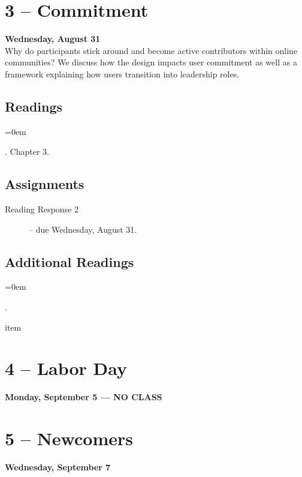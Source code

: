 \documentclass[11pt]{memoir}
\newenvironment{readinglist}{
\begin{list}{}{\leftmargin=8pt \itemindent=0em}
  \setlength{\itemsep}{8pt}
  \setlength{\parskip}{0em}
  \setlength{\parsep}{1em}
  \setlength{\parindent}{8em}}
{\end{list}}
\begin{document}
\section{3 -- Commitment}
\textcolor{CUGold}{\textbf{Wednesday, August 31}}\\
Why do participants stick around and become active contributors within online communities? We discuss how the design impacts user commitment as well as a framework explaining how users transition into leadership roles.

    \subsection{Readings}
    \begin{readinglist}
        \item {}
        \item {}. Chapter 3.
        \item {}
    \end{readinglist}
    
    \subsection{Assignments}
    \begin{description}%
        \item[Reading Response 2 ] -- due Wednesday, August 31. 
    \end{description}
    
    \subsection{Additional Readings}
    \begin{readinglist}
        \item {}.
        \item \bibentry{}
        item \bibentry{}
    \end{readinglist}

\section{4 -- Labor Day}
\textcolor{CUGold}{\textbf{Monday, September 5 --- NO CLASS}}\\

\section{5 -- Newcomers}
\textcolor{CUGold}{\textbf{Wednesday, September 7}}\\
\end{document}
